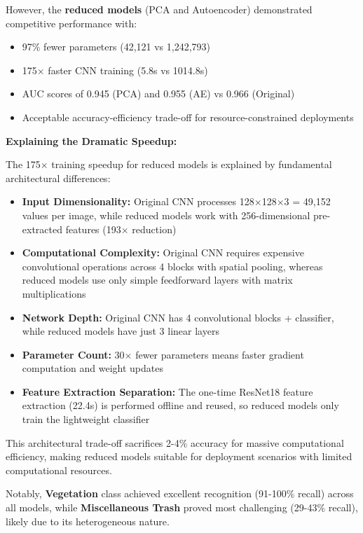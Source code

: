 \documentclass[11pt,a4paper]{article}
\begin{document}
However, the \textbf{reduced models} (PCA and Autoencoder) demonstrated competitive performance with:
\begin{itemize}
    \item 97\% fewer parameters (42,121 vs 1,242,793)
    \item 175$\times$ faster CNN training (5.8s vs 1014.8s)
    \item AUC scores of 0.945 (PCA) and 0.955 (AE) vs 0.966 (Original)
    \item Acceptable accuracy-efficiency trade-off for resource-constrained deployments
\end{itemize}

\textbf{Explaining the Dramatic Speedup:}

The 175$\times$ training speedup for reduced models is explained by fundamental architectural differences:

\begin{itemize}
    \item \textbf{Input Dimensionality:} Original CNN processes 128$\times$128$\times$3 = 49,152 values per image, while reduced models work with 256-dimensional pre-extracted features (193$\times$ reduction)
    \item \textbf{Computational Complexity:} Original CNN requires expensive convolutional operations across 4 blocks with spatial pooling, whereas reduced models use only simple feedforward layers with matrix multiplications
    \item \textbf{Network Depth:} Original CNN has 4 convolutional blocks + classifier, while reduced models have just 3 linear layers
    \item \textbf{Parameter Count:} 30$\times$ fewer parameters means faster gradient computation and weight updates
    \item \textbf{Feature Extraction Separation:} The one-time ResNet18 feature extraction (22.4s) is performed offline and reused, so reduced models only train the lightweight classifier
\end{itemize}

This architectural trade-off sacrifices 2-4\% accuracy for massive computational efficiency, making reduced models suitable for deployment scenarios with limited computational resources.

Notably, \textbf{Vegetation} class achieved excellent recognition (91-100\% recall) across all models, while \textbf{Miscellaneous Trash} proved most challenging (29-43\% recall), likely due to its heterogeneous nature.
\end{document}

